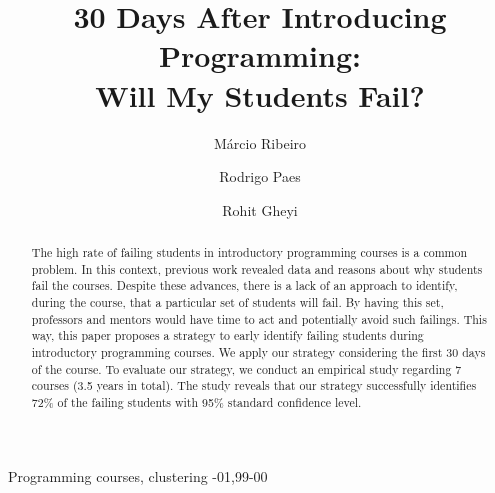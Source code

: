 \documentclass[review]{elsarticle}
\begin{document}
\begin{frontmatter}

\title{30 Days After Introducing Programming:\\Will My Students Fail?}



\author[ufal]{M\'{a}rcio Ribeiro}

\author[ufal]{Rodrigo Paes}

\author[ufcg]{Rohit Gheyi}

\address[ufal]{Federal University of Alagoas, Macei\'{o}, Brazil}
\address[ufcg]{Federal University of Campina Grande, Campina Grande, Brazil}

\begin{abstract}
The high rate of failing students in introductory programming courses is a common problem. In this context, previous work revealed data and reasons about why students fail the courses. Despite these advances, there is a lack of an approach to identify, during the course, that a particular set of students will fail. By having this set, professors and mentors would have time to act and potentially avoid such failings. This way, this paper proposes a strategy to early identify failing students during introductory programming courses. We apply our strategy considering the first 30 days of the course. To evaluate our strategy, we conduct an empirical study regarding 7 courses (3.5 years in total). The study reveals that our strategy successfully identifies 72\% of the failing students with 95\% standard confidence level.
\end{abstract}

\begin{keyword}
Programming courses, clustering
-01\sep  99-00
\end{keyword}

\end{frontmatter}

\linenumbers















\end{document}
